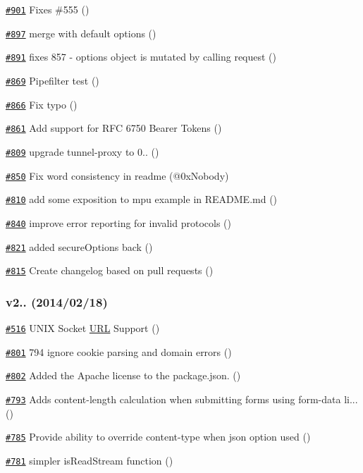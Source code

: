 \begin{DoxyItemize}
\item \href{https://github.com/request/request/pull/901}{\tt \#901} Fixes \#555 ()
\item \href{https://github.com/request/request/pull/897}{\tt \#897} merge with default options ()
\item \href{https://github.com/request/request/pull/891}{\tt \#891} fixes 857 -\/ options object is mutated by calling request ()
\item \href{https://github.com/request/request/pull/869}{\tt \#869} Pipefilter test ()
\item \href{https://github.com/request/request/pull/866}{\tt \#866} Fix typo ()
\item \href{https://github.com/request/request/pull/861}{\tt \#861} Add support for R\+FC 6750 Bearer Tokens ()
\item \href{https://github.com/request/request/pull/809}{\tt \#809} upgrade tunnel-\/proxy to 0.. ()
\item \href{https://github.com/request/request/pull/850}{\tt \#850} Fix word consistency in readme (@0x\+Nobody)
\item \href{https://github.com/request/request/pull/810}{\tt \#810} add some exposition to mpu example in R\+E\+A\+D\+M\+E.\+md ()
\item \href{https://github.com/request/request/pull/840}{\tt \#840} improve error reporting for invalid protocols ()
\item \href{https://github.com/request/request/pull/821}{\tt \#821} added secure\+Options back ()
\item \href{https://github.com/request/request/pull/815}{\tt \#815} Create changelog based on pull requests ()
\end{DoxyItemize}

\subsubsection*{v2.. (2014/02/18)}


\begin{DoxyItemize}
\item \href{https://github.com/request/request/pull/516}{\tt \#516} U\+N\+IX Socket \mbox{\hyperlink{namespace_u_r_l}{U\+RL}} Support ()
\item \href{https://github.com/request/request/pull/801}{\tt \#801} 794 ignore cookie parsing and domain errors ()
\item \href{https://github.com/request/request/pull/802}{\tt \#802} Added the Apache license to the package.\+json. ()
\item \href{https://github.com/request/request/pull/793}{\tt \#793} Adds content-\/length calculation when submitting forms using form-\/data li... ()
\item \href{https://github.com/request/request/pull/785}{\tt \#785} Provide ability to override content-\/type when {\ttfamily json} option used ()
\item \href{https://github.com/request/request/pull/781}{\tt \#781} simpler is\+Read\+Stream function ()
\end{DoxyItemize}

